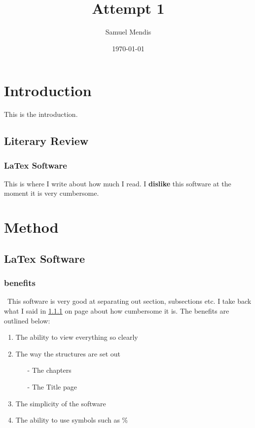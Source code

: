 \documentclass[a4paper,11pt]{report}
\begin{document}
\title{Attempt 1}
\author{Samuel Mendis}
\date{\today}
\maketitle
\tableofcontents
\chapter{Introduction}
This is the introduction.

\section{Literary Review}

\subsection{LaTex Software}
\label{sec1}

This is where I write about how much I read.
I \textbf{dislike} this software at the moment it is very cumbersome.


\chapter{Method}

\section{LaTex Software}

\subsection{benefits}
\
This software is very {\color{red}good} at separating out section, subsections etc. I take back what I said in \ref{sec1} on page %
\pageref{sec1} about how cumbersome it is. The benefits are outlined below:
\begin{enumerate}
\item The ability to view everything so clearly
\item The way the structures are set out
\begin{itemize}
\item[-] The chapters
\item[-] The Title page
\end{itemize}
\item The simplicity of the software
\item The ability to use symbols such as \%
\end{enumerate}
\end{document}
